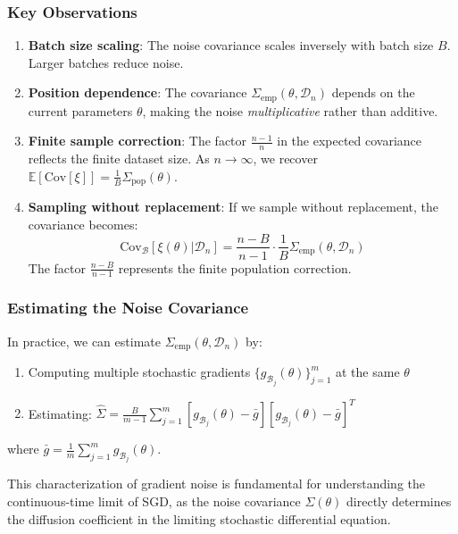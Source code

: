 \documentclass[11pt]{article}
\begin{document}
\subsubsection{Key Observations}

\begin{enumerate}
    \item \textbf{Batch size scaling}: The noise covariance scales inversely with batch size $B$. Larger batches reduce noise.
    
    \item \textbf{Position dependence}: The covariance $\Sigma_{\text{emp}}(\theta, \mathcal{D}_n)$ depends on the current parameters $\theta$, making the noise \textit{multiplicative} rather than additive.
    
    \item \textbf{Finite sample correction}: The factor $\frac{n-1}{n}$ in the expected covariance reflects the finite dataset size. As $n \to \infty$, we recover $\mathbb{E}[\text{Cov}[\xi]] = \frac{1}{B} \Sigma_{\text{pop}}(\theta)$.
    
    \item \textbf{Sampling without replacement}: If we sample without replacement, the covariance becomes:
    $$\text{Cov}_{\mathcal{B}}[\xi(\theta) | \mathcal{D}_n] = \frac{n-B}{n-1} \cdot \frac{1}{B} \Sigma_{\text{emp}}(\theta, \mathcal{D}_n)$$
    The factor $\frac{n-B}{n-1}$ represents the finite population correction.
\end{enumerate}

\subsubsection{Estimating the Noise Covariance}

In practice, we can estimate $\Sigma_{\text{emp}}(\theta, \mathcal{D}_n)$ by:
\begin{enumerate}
    \item Computing multiple stochastic gradients $\{g_{\mathcal{B}_j}(\theta)\}_{j=1}^m$ at the same $\theta$
    \item Estimating: $\hat{\Sigma} = \frac{B}{m-1} \sum_{j=1}^m [g_{\mathcal{B}_j}(\theta) - \bar{g}][g_{\mathcal{B}_j}(\theta) - \bar{g}]^T$
\end{enumerate}

where $\bar{g} = \frac{1}{m} \sum_{j=1}^m g_{\mathcal{B}_j}(\theta)$.

This characterization of gradient noise is fundamental for understanding the continuous-time limit of SGD, as the noise covariance $\Sigma(\theta)$ directly determines the diffusion coefficient in the limiting stochastic differential equation.
\end{document}
